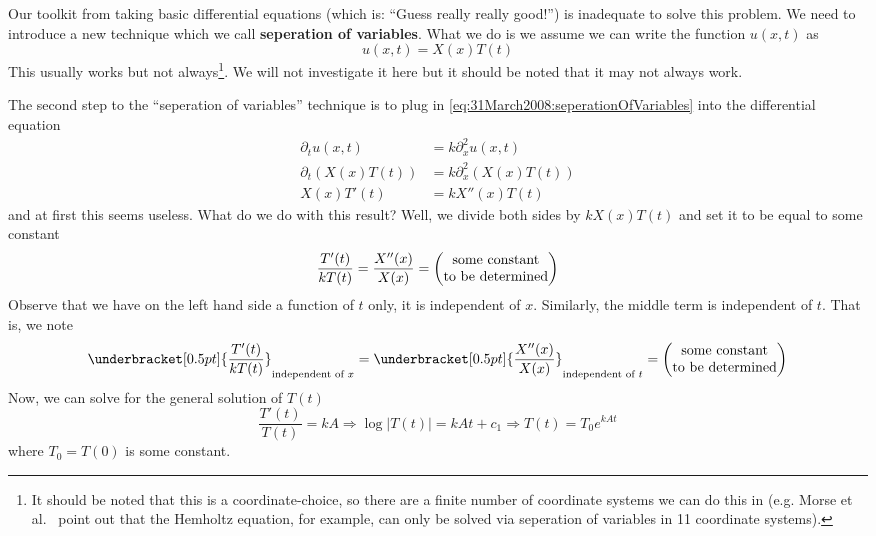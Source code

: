 Our toolkit from taking basic differential equations (which is:
``Guess really really good!'') is inadequate to solve this
problem. We need to introduce a new
technique which we call
\textbf{seperation of variables}. What we do is we assume we can
write the function $u(x,t)$ as
\begin{equation}\label{eq:31March2008:seperationOfVariables}
u(x,t)=X(x)T(t)
\end{equation}
This usually works but not always\footnote{It should be noted
  that this is a coordinate-choice, so there are a finite number
  of coordinate systems we can do this in (e.g. Morse et
  al.~\cite{morseVolTwo} point out that the Hemholtz equation,
  for example, can only be solved via seperation of variables in
  11 coordinate systems).}. We will not investigate it here but
it should be noted that it may not always work.

The second step to the ``seperation of
variables'' technique is
to plug in \eqref{eq:31March2008:seperationOfVariables} into the
differential equation
\begin{subequations}
\begin{align}
\partial_{t} u(x,t) &= k\partial_{x}^{2}u(x,t) \\
\partial_{t} (X(x)T(t)) &= k\partial_{x}^{2}(X(x)T(t)) \\
X(x)T'(t) &= kX''(x)T(t)
\end{align}
\end{subequations}
and at first this seems useless. What do we do with this result?
Well, we divide both sides by $kX(x)T(t)$ and set it to be equal
to some constant
\begin{equation}
\frac{T'(t)}{kT(t)} = \frac{X''(x)}{X(x)}
= \begin{pmatrix}$some$\ $constant$\\$to$\ $be$\ $determined$\end{pmatrix}
\end{equation}
Observe that we have on the left hand side a function of $t$
only, it is independent of $x$. Similarly, the middle term is
independent of $t$. That is, we note
\begin{equation*}
\underbracket[0.5pt]{\frac{T'(t)}{kT(t)}}_{\text{independent of $x$}} =
\underbracket[0.5pt]{ \frac{X''(x)}{X(x)}}_{\text{independent of $t$}} =  \begin{pmatrix}$some$\ $constant$\\$to$\ $be$\ $determined$\end{pmatrix}
\end{equation*}
Now, we can solve for the general solution of $T(t)$
\begin{equation}
\frac{T'(t)}{T(t)}=kA\Rightarrow \log|T(t)|=kAt +
c_{1}\Rightarrow T(t)=T_{0}e^{kAt}
\end{equation}
where $T_{0}=T(0)$ is some constant.                            

